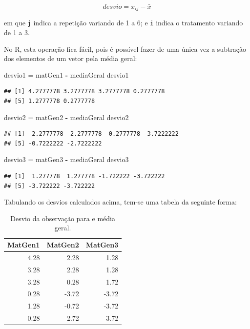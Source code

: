 \documentclass[
]{article}
\newenvironment{Shaded}{\begin{snugshade}}{\end{snugshade}}
\newcommand{\NormalTok}[1]{#1}
\newcommand{\OperatorTok}[1]{\textcolor[rgb]{0.81,0.36,0.00}{\textbf{#1}}}
\newcommand{\StringTok}[1]{\textcolor[rgb]{0.31,0.60,0.02}{#1}}
\begin{document}
\[desvio = x_{ij} - \bar{x}\]

em que \texttt{j} indica a repetição variando de 1 a 6; e \texttt{i} indica o tratamento variando de 1 a 3.

No R, esta operação fica fácil, pois é possível fazer de uma única vez a subtração dos elementos de um vetor pela média geral:

\begin{Shaded}
\begin{Highlighting}[]
\NormalTok{desvio1 =}\StringTok{ }\NormalTok{matGen1 }\OperatorTok{-}\StringTok{ }\NormalTok{mediaGeral}
\NormalTok{desvio1}
\end{Highlighting}
\end{Shaded}

\begin{verbatim}
## [1] 4.2777778 3.2777778 3.2777778 0.2777778
## [5] 1.2777778 0.2777778
\end{verbatim}

\begin{Shaded}
\begin{Highlighting}[]
\NormalTok{desvio2 =}\StringTok{ }\NormalTok{matGen2 }\OperatorTok{-}\StringTok{ }\NormalTok{mediaGeral}
\NormalTok{desvio2}
\end{Highlighting}
\end{Shaded}

\begin{verbatim}
## [1]  2.2777778  2.2777778  0.2777778 -3.7222222
## [5] -0.7222222 -2.7222222
\end{verbatim}

\begin{Shaded}
\begin{Highlighting}[]
\NormalTok{desvio3 =}\StringTok{ }\NormalTok{matGen3 }\OperatorTok{-}\StringTok{ }\NormalTok{mediaGeral}
\NormalTok{desvio3}
\end{Highlighting}
\end{Shaded}

\begin{verbatim}
## [1]  1.277778  1.277778 -1.722222 -3.722222
## [5] -3.722222 -3.722222
\end{verbatim}

Tabulando os desvios calculados acima, tem-se uma tabela da seguinte forma:

\begin{table}

\caption{\label{tab:unnamed-chunk-16}Desvio da observação para e média geral.}
\centering
\begin{tabular}[t]{r|r|r}
\hline
MatGen1 & MatGen2 & MatGen3\\
\hline
4.28 & 2.28 & 1.28\\
\hline
3.28 & 2.28 & 1.28\\
\hline
3.28 & 0.28 & 1.72\\
\hline
0.28 & -3.72 & -3.72\\
\hline
1.28 & -0.72 & -3.72\\
\hline
0.28 & -2.72 & -3.72\\
\hline
\end{tabular}
\end{table}
\end{document}
